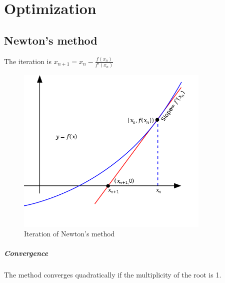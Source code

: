 \documentclass[../main.tex]{subfiles}
\begin{document}
\chapter{Optimization}
\section{Newton's method}
The iteration is $x_{n+1} = x_n - \frac{f(x_n)}{f'(x_n)}$
\begin{figure}[!ht]
    \centering
    \includegraphics[height=8cm,scale=0.2]{assets/newton-method.png}
    \caption{Iteration of Newton's method}
\end{figure}
\paragraph{Convergence}
The method converges quadratically if the multiplicity of the root is 1.
\end{document}
